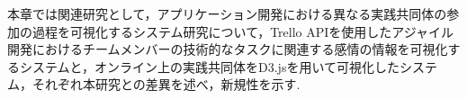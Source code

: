 

本章では関連研究として，アプリケーション開発における異なる実践共同体の参加の過程を可視化するシステム研究について，Trello APIを使用したアジャイル開発におけるチームメンバーの技術的なタスクに関連する感情の情報を可視化するシステムと，オンライン上の実践共同体をD3.jsを用いて可視化したシステム，それぞれ本研究との差異を述べ，新規性を示す.